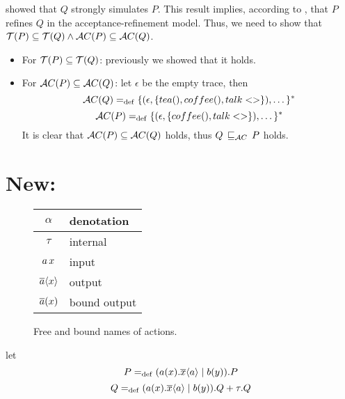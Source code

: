   showed that $Q$ strongly simulates $P$. This result implies, according to , that $P$ refines $Q$ in the acceptance-refinement model. Thus, we need to show that $\Traces[P]\subseteq\Traces[Q] \wedge \Accepatances[P]\subseteq\Accepatances[Q]$.
 
 \begin{itemize}
\item For $\Traces[P]\subseteq\Traces[Q]$: previously we showed that it holds. 

\item For $\Accepatances[P]\subseteq\Accepatances[Q]$: let $\epsilon$ be the empty trace, then
    \[\Accepatances[Q] \define \{(\epsilon,\{tea(),coffee(),talk<>\}),\dots\}^\ast\]
    \[\Accepatances[P] \define \{(\epsilon,\{coffee(),talk<>\}),\dots\}^\ast\]
It is clear that $\Accepatances[P]\subseteq\Accepatances[Q]$ holds, thus $Q \refiAC P$ holds.
\end{itemize}

\section{ New:}
\begin{figure}[!h]
\centering
\begin{tabular}{c|l}
$\alpha$      & denotation \\\hline
$\tau$        & internal \\
$a\,x$  & input  \\
$\overline{a}\langle x\rangle$  & output        \\
$\overline{a}(x)$ & bound output
\end{tabular}
\caption{Free and bound names of actions.}
\label{fig_names_act}
\end{figure}

let 
\[P=_{\mathrm{def}}(a(x).\overline{x}\langle a\rangle \mid b(y)).P\]
\[Q=_{\mathrm{def}}(a(x).\overline{x}\langle a\rangle \mid b(y)).Q + \tau.Q\]


